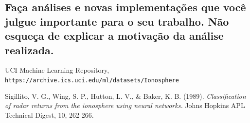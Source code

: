 \documentclass[12pt]{article}
\begin{document}
\subsection{Faça análises e novas implementações que você julgue importante para o seu trabalho. Não esqueça de explicar a motivação da análise realizada.}


\begin{thebibliography}{99} 
	
	UCI Machine Learning Repository,\\ \texttt{https://archive.ics.uci.edu/ml/datasets/Ionosphere}
	
	 Sigillito, V. G., Wing, S. P., Hutton, L. V., \& Baker, K. B. (1989). \textit{Classification of radar returns from the ionosphere using neural networks.} Johns Hopkins APL Technical Digest, 10, 262-266.
	
	
	
	
	
	
\end{thebibliography}
\end{document}

